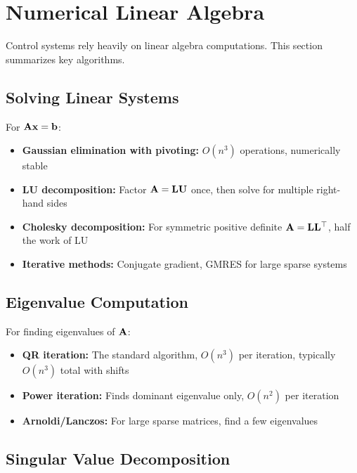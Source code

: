 \section{Numerical Linear Algebra}
\label{sec:numerical_linalg}

Control systems rely heavily on linear algebra computations. This section summarizes key algorithms.

\subsection{Solving Linear Systems}

For $\mathbf{A}\mathbf{x} = \mathbf{b}$:

\begin{itemize}
    \item \textbf{Gaussian elimination with pivoting:} $O(n^3)$ operations, numerically stable
    \item \textbf{LU decomposition:} Factor $\mathbf{A} = \mathbf{L}\mathbf{U}$ once, then solve for multiple right-hand sides
    \item \textbf{Cholesky decomposition:} For symmetric positive definite $\mathbf{A} = \mathbf{L}\mathbf{L}^\top$, half the work of LU
    \item \textbf{Iterative methods:} Conjugate gradient, GMRES for large sparse systems
\end{itemize}

\subsection{Eigenvalue Computation}

For finding eigenvalues of $\mathbf{A}$:

\begin{itemize}
    \item \textbf{QR iteration:} The standard algorithm, $O(n^3)$ per iteration, typically $O(n^3)$ total with shifts
    \item \textbf{Power iteration:} Finds dominant eigenvalue only, $O(n^2)$ per iteration
    \item \textbf{Arnoldi/Lanczos:} For large sparse matrices, find a few eigenvalues
\end{itemize}

\subsection{Singular Value Decomposition}


